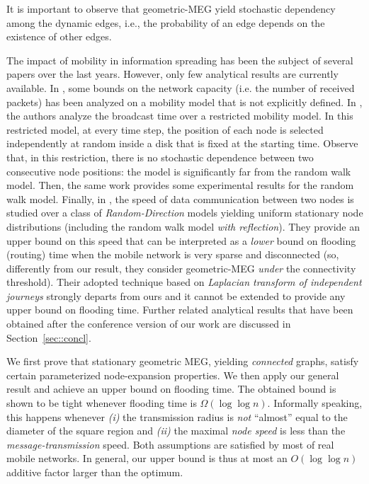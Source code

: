 \documentclass[10pt,a4paper]{article}
\begin{document}
\noindent It is important to observe that geometric-MEG yield stochastic dependency among the dynamic edges, i.e., the probability of an edge depends on the existence of other edges.

\noindent The impact of mobility in information spreading has been the subject of several papers over the last years.
However, only few analytical results are currently available. In \cite{GT02}, some bounds on the network capacity (i.e. the number of received packets) has been analyzed on a mobility model that is not explicitly defined. In \cite{KY08}, the authors analyze the broadcast time over a restricted mobility model. In this restricted model, at every time step, the position of each  node is selected independently at random inside a disk that is fixed at the starting time. Observe that, in this restriction, there is no stochastic dependence between two consecutive node positions: the model is significantly far from the random walk model. Then, the same work provides some experimental results for the random walk model. Finally, in \cite{JMR09}, the speed of data communication between two nodes is studied over a class of \emph{Random-Direction} models yielding uniform stationary node distributions (including the random walk model \emph{with reflection}). They provide an upper bound on this speed that can be interpreted as a   \emph{lower} bound on flooding (routing) time when the mobile  network is very sparse and disconnected (so, differently from our result, they consider geometric-MEG \emph{under} the connectivity threshold). Their adopted technique based on \emph{Laplacian transform of independent journeys} strongly departs from ours and it cannot be extended to provide any upper bound on flooding time. Further related analytical results that have been obtained after the conference version of our work are discussed in Section~\ref{sec::concl}.


\noindent We first prove that stationary geometric MEG, yielding \emph{connected} graphs, satisfy certain parameterized node-expansion properties. We then apply our general result and achieve an upper bound on flooding time. The obtained bound is shown to be tight whenever flooding time is $\Omega(\log\log n)$. Informally speaking, this happens whenever \emph{(i)} the transmission radius is \emph{not} ``almost'' equal to the diameter of the square region and \emph{(ii)} the maximal \emph{node speed} is less than the \emph{message-transmission} speed. Both assumptions are satisfied by most of real mobile networks. In general, our upper bound is thus at most an $O(\log\log n)$ additive factor larger than the optimum.
\end{document}
